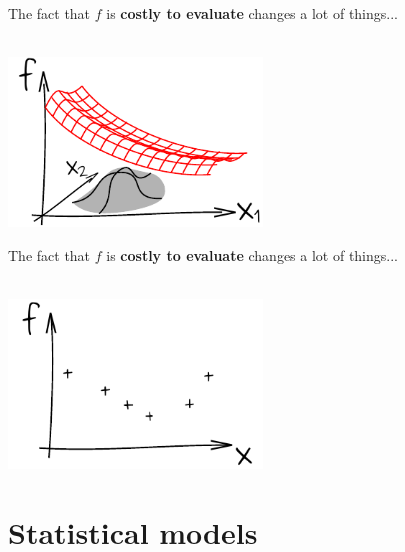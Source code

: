 \documentclass{beamer}
\begin{document}
\begin{frame}{}
The fact that $f$ is \textbf{costly to evaluate} changes a lot of things...\\
\vspace{5mm}
\\
\vspace{5mm}
\begin{center}
\includegraphics[height=4.5cm]{figures/ink_as}
\end{center}
\end{frame}

\begin{frame}{}
The fact that $f$ is \textbf{costly to evaluate} changes a lot of things...\\
\vspace{5mm}
\\
\vspace{5mm}
\begin{center}
\includegraphics[height=4.5cm]{figures/ink_fX}
\end{center}
\end{frame}


\section[Statistical models]{Statistical models}
\subsection{}
\end{document}
